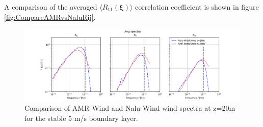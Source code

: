 A comparison of the averaged $\langle R_{11}(\boldsymbol{\xi})\rangle$
correlation coefficient is shown in figure
\ref{fig:CompareAMRvsNaluRij}.

\begin{figure} %
  \centering
  \includegraphics[width=7.0in]{figures/Compare_AMRWind_NaluWind/AMRWind_NaluWind_Spectra_Stable_z20.png}

  \caption{\label{fig:CompareAMRvsNaluSpectra} Comparison of AMR-Wind
    and Nalu-Wind wind spectra at z=20m for the stable 5 m/s boundary
    layer. }
\end{figure}

